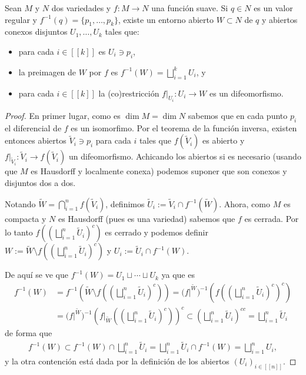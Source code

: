 \documentclass[11pt]{article}
\newcommand{\nat}[1]{[\![#1]\!]}
\newcommand{\paint}[1]{\color{color}{#1}}
\newenvironment{lemma}[2][Lema]{\begin{trivlist}
\item[\hskip \labelsep \paint{{\bfseries #1}}\hskip \labelsep {\bfseries #2.}]}{\end{trivlist}}
\begin{document}
\begin{lemma}{3} Sean $M$ y $N$ dos variedades y $f : M \to N$ una función suave. Si $q \in N$ es un valor regular y $f^{-1}(q) = \{p_1, \dots, p_k\}$, existe un entorno abierto $W \subset N$ de $q$ y abiertos conexos disjuntos $U_1, \dots, U_k$ tales que:
\begin{itemize}
\item[(i)] para cada $i \in \nat{k}$ es $U_i \ni p_i$,
\item[(ii)] la preimagen de $W$ por $f$ es $f^{-1}(W) = \bigsqcup_{i=1}^k U_i$, y
\item[(iii)] para cada $i \in \nat{k}$ la (co)restricción $f|_{U_i} : U_i \to W$ es un difeomorfismo.
\end{itemize}
\end{lemma}
\begin{proof} En primer lugar, como es $\dim  M = \dim N$ sabemos que en cada punto $p_i$ el diferencial de $f$ es un isomorfimo. Por el teorema de la función inversa, existen entonces abiertos $\widetilde{V}_i \ni p_i$ para cada $i$ tales que $f(\widetilde{V}_i)$ es abierto y $f|_{\widetilde{V}_i} : \widetilde{V}_i \to f(\widetilde{V}_i)$ un difeomorfismo. Achicando los abiertos si es necesario (usando que $M$ es Hausdorff y localmente conexa) podemos suponer que son conexos y disjuntos dos a dos.

Notando $\widetilde{W} = \bigcap_{i=1}^nf(\widetilde{V}_i)$, definimos $\widetilde{U}_i := \widetilde{V}_i \cap f^{-1}(\widetilde{W})$. Ahora, como $M$ es compacta y $N$ es Hausdorff (pues es una variedad) sabemos que $f$ es cerrada. Por lo tanto $f\left((\bigsqcup_{i=1}^n\widetilde{U}_i)^c\right)$ es cerrado y podemos definir $W := \widetilde{W} \setminus f\left((\bigsqcup_{i=1}^n\widetilde{U}_i)^c\right)$ y $U_i := \widetilde{U}_i \cap f^{-1}(W)$.

De aquí se ve que $f^{-1}(W) = U_1 \sqcup \cdots \sqcup U_k$ ya que es
\begin{align*}
f^{-1}(W) &= f^{-1}\left(\widetilde{W} \setminus f\left(\left(\bigsqcup_{i=1}^n\widetilde{U}_i\right)^c\right)\right) = \big(f|^{\widetilde{W}}\big)^{-1}\left(f\left(\left(\bigsqcup_{i=1}^n\widetilde{U}_i\right)^c\right)^c\right)\\
&= \big(f|^{\widetilde{W}}\big)^{-1}\left(f|_{\widetilde{W}}\left(\left(\bigsqcup_{i=1}^n\widetilde{U}_i\right)^c\right)\right)^c \subset \left(\bigsqcup_{i=1}^n\widetilde{U}_i\right)^{cc} = \bigsqcup_{i=1}^n\widetilde{U}_i 
\end{align*}
de forma que
\begin{align*}
f^{-1}(W) \subset f^{-1}(W) \cap \bigsqcup_{i=1}^n\widetilde{U}_i  = \bigsqcup_{i=1}^n\widetilde{U}_i \cap f^{-1}(W) = \bigsqcup_{i=1}^nU_i,  
\end{align*}
y la otra contención está dada por la definición de los abiertos $(U_i)_{i \in \nat{n}}$. 


\end{proof}
\end{document}

